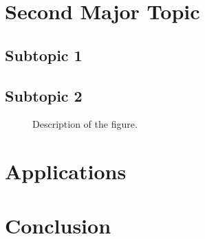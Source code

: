 \section{Second Major Topic}
\subsection{Subtopic 1}

\subsection{Subtopic 2}

\begin{figure}[htbp]
\centering
\caption{Description of the figure.}
\label{fig:label}
\end{figure}

\section{Applications}

\section{Conclusion}

